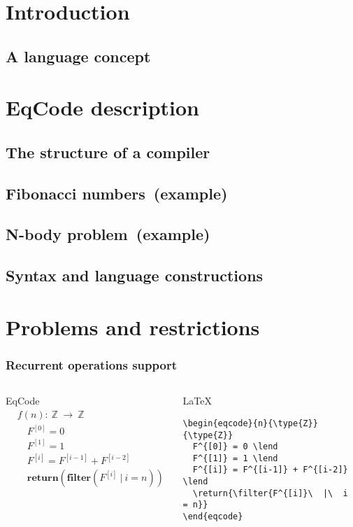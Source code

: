 \documentclass[xcolor=dvipsnames,mathserif,professionalfont,12pt]{beamer}
\begin{document}
\section{Introduction}
\subsection{A language concept}
\section{EqCode description}
\subsection{The structure of a compiler}
\subsection{Fibonacci numbers\  (example)}
\subsection{N-body problem\ (example)}
\subsection{Syntax and language constructions}
\section{Problems and restrictions}

\begin{frame}[fragile]
  \frametitle{Recurrent operations support}
  \begin{columns}[t]
    \begin{block}{EqCode}
      \begin{align*}
& f(n):\  \mathbb{Z}\  \rightarrow\  \mathbb{Z} \\
& \quad F^{[0]} = 0 \\
& \quad F^{[1]} = 1 \\
& \quad F^{[i]} = F^{[i-1]} + F^{[i-2]} \\
& \quad {\textbf {return}}({\textbf {filter}}(F^{[i]}\  |\  i = n))
      \end{align*}
    \end{block}
      \begin{block}{\LaTeX}
      \begin{lstlisting}
\begin{eqcode}{n}{\type{Z}}{\type{Z}}
  F^{[0]} = 0 \lend
  F^{[1]} = 1 \lend
  F^{[i]} = F^{[i-1]} + F^{[i-2]} \lend
  \return{\filter{F^{[i]}\  |\  i = n}}
\end{eqcode}
      \end{lstlisting}
      \end{block}
  \end{columns}
\end{frame}
\end{document}
